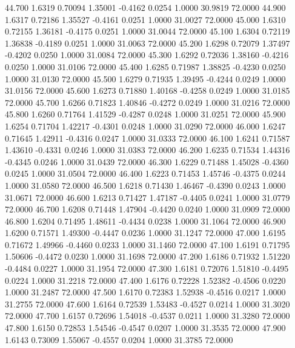   44.700   1.6319   0.70094   1.35001  -0.4162   0.0254   1.0000  30.9819  72.0000
  44.900   1.6317   0.72186   1.35527  -0.4161   0.0251   1.0000  31.0027  72.0000
  45.000   1.6310   0.72155   1.36181  -0.4175   0.0251   1.0000  31.0044  72.0000
  45.100   1.6304   0.72119   1.36838  -0.4189   0.0251   1.0000  31.0063  72.0000
  45.200   1.6298   0.72079   1.37497  -0.4202   0.0250   1.0000  31.0084  72.0000
  45.300   1.6292   0.72036   1.38160  -0.4216   0.0250   1.0000  31.0106  72.0000
  45.400   1.6285   0.71987   1.38825  -0.4230   0.0250   1.0000  31.0130  72.0000
  45.500   1.6279   0.71935   1.39495  -0.4244   0.0249   1.0000  31.0156  72.0000
  45.600   1.6273   0.71880   1.40168  -0.4258   0.0249   1.0000  31.0185  72.0000
  45.700   1.6266   0.71823   1.40846  -0.4272   0.0249   1.0000  31.0216  72.0000
  45.800   1.6260   0.71764   1.41529  -0.4287   0.0248   1.0000  31.0251  72.0000
  45.900   1.6254   0.71704   1.42217  -0.4301   0.0248   1.0000  31.0290  72.0000
  46.000   1.6247   0.71645   1.42911  -0.4316   0.0247   1.0000  31.0333  72.0000
  46.100   1.6241   0.71587   1.43610  -0.4331   0.0246   1.0000  31.0383  72.0000
  46.200   1.6235   0.71534   1.44316  -0.4345   0.0246   1.0000  31.0439  72.0000
  46.300   1.6229   0.71488   1.45028  -0.4360   0.0245   1.0000  31.0504  72.0000
  46.400   1.6223   0.71453   1.45746  -0.4375   0.0244   1.0000  31.0580  72.0000
  46.500   1.6218   0.71430   1.46467  -0.4390   0.0243   1.0000  31.0671  72.0000
  46.600   1.6213   0.71427   1.47187  -0.4405   0.0241   1.0000  31.0779  72.0000
  46.700   1.6208   0.71448   1.47904  -0.4420   0.0240   1.0000  31.0909  72.0000
  46.800   1.6204   0.71495   1.48611  -0.4434   0.0238   1.0000  31.1064  72.0000
  46.900   1.6200   0.71571   1.49300  -0.4447   0.0236   1.0000  31.1247  72.0000
  47.000   1.6195   0.71672   1.49966  -0.4460   0.0233   1.0000  31.1460  72.0000
  47.100   1.6191   0.71795   1.50606  -0.4472   0.0230   1.0000  31.1698  72.0000
  47.200   1.6186   0.71932   1.51220  -0.4484   0.0227   1.0000  31.1954  72.0000
  47.300   1.6181   0.72076   1.51810  -0.4495   0.0224   1.0000  31.2218  72.0000
  47.400   1.6176   0.72228   1.52382  -0.4506   0.0220   1.0000  31.2487  72.0000
  47.500   1.6170   0.72383   1.52938  -0.4516   0.0217   1.0000  31.2755  72.0000
  47.600   1.6164   0.72539   1.53483  -0.4527   0.0214   1.0000  31.3020  72.0000
  47.700   1.6157   0.72696   1.54018  -0.4537   0.0211   1.0000  31.3280  72.0000
  47.800   1.6150   0.72853   1.54546  -0.4547   0.0207   1.0000  31.3535  72.0000
  47.900   1.6143   0.73009   1.55067  -0.4557   0.0204   1.0000  31.3785  72.0000
